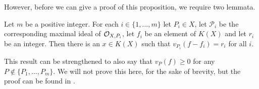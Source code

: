 However, before we can give a proof of this proposition, we require two lemmata.

    \begin{lem}\label{lemmaapproximationlemma}
    Let $m$ be a positive integer. 
    For each $i\in \{1,\ldots, m\}$ let $P_i\in X$, let $\mathcal{P}_i$ be the corresponding maximal ideal of ${\cal O}_{X,P_i}$, let $f_i$ be an element of $K(X)$ and let $r_i$ be an integer.
    Then there is an $x\in K(X)$ such that $v_{P_i}(f-f_i) = r_i$ for all $i$.
    \end{lem}
    
    \begin{rem}
    This result can be strengthened to also say that $v_P(f) \geq 0$ for any $P\notin \{P_1,\ldots ,P_m\}$.
    We will not prove this here, for the sake of brevity, but the proof can be found in \cite[Chap. 1, \S 3, pg. 12]{localfields}.
    \end{rem}

